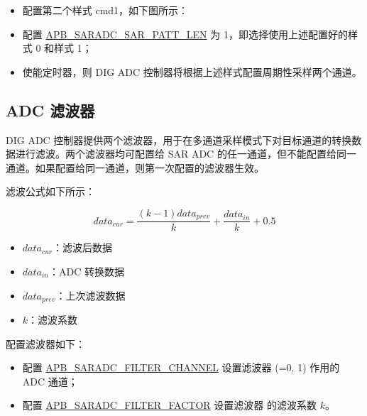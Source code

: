 \documentclass[main\_\_CN.tex]{subfiles}
\begin{document}
\begin{itemize}
    \item 配置第二个样式 cmd1，如下图所示：

\centering
{}%
%
%
\reglabel{}\regnewline%
\begin{regdesc}\end{regdesc}
\end{itemize}

\begin{itemize}
    \item 配置 \hyperref[fielddesc:APBSARADCSARPATTLEN]{APB\_SARADC\_SAR\_PATT\_LEN} 为 1，即选择使用上述配置好的样式 0 和样式 1；
    \item 使能定时器，则 DIG ADC 控制器将根据上述样式配置周期性采样两个通道。
\end{itemize}


\subsection{ADC 滤波器}\label{sec:adc_filter}
DIG ADC 控制器提供两个滤波器，用于在多通道采样模式下对目标通道的转换数据进行滤波。两个滤波器均可配置给 SAR ADC 的任一通道，但不能配置给同一通道。如果配置给同一通道，则第一次配置的滤波器生效。

滤波公式如下所示：

\[data_{cur} = \frac{(k-1)data_{prev}}{k}+\frac{data_{in}}{k}+0.5\]

\begin{itemize}
    \item \(data_{cur}\)：滤波后数据
    \item \(data_{in}\)：ADC 转换数据
    \item \(data_{prev}\)：上次滤波数据
    \item \(k\)：滤波系数
\end{itemize}


配置滤波器如下：
\begin{itemize}
\item 配置 \hyperref[fielddesc:APBSARADCFILTERCHANNEL1]{APB\_SARADC\_FILTER\_CHANNEL}  设置滤波器  (=0, 1) 作用的 ADC 通道；
\item 配置 \hyperref[fielddesc:APBSARADCFILTERFACTOR1]{APB\_SARADC\_FILTER\_FACTOR} 设置滤波器  的滤波系数 \(k\)。
\end{itemize}
\end{document}
